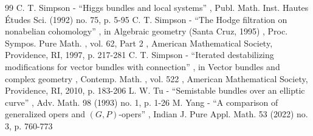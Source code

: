 \documentclass[11pt]{article}
\numberwithin{equation}{section}
\theoremstyle{plain}
\theoremstyle{definition}
\begin{document}
\begin{thebibliography}{99}
 C. T. Simpson - “Higgs bundles and local systems” , Publ. Math. Inst. Hautes Études Sci. (1992) no. 75, p. 5-95
 C. T. Simpson - “The Hodge filtration on nonabelian cohomology” , in Algebraic geometry (Santa Cruz, 1995) , Proc. Sympos. Pure Math. , vol. 62, Part 2 , American Mathematical Society, Providence, RI, 1997, p. 217-281
 C. T. Simpson - “Iterated destabilizing modifications for vector bundles with connection” , in Vector bundles and complex geometry , Contemp. Math. , vol. 522 , American Mathematical Society, Providence, RI, 2010, p. 183-206
 L. W. Tu - “Semistable bundles over an elliptic curve” , Adv. Math. 98 (1993) no. 1, p. 1-26
 M. Yang - “A comparison of generalized opers and $(G,P)$-opers” , Indian J. Pure Appl. Math. 53 (2022) no. 3, p. 760-773
\end{thebibliography}
\end{document}
